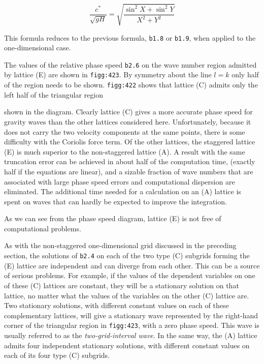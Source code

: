 \[\frac{c^*}{ \sqrt{gH}} = \sqrt{\frac{\sin^{2}X + \sin^{2}Y}{X^{2} + Y^{2}}}\]

This formula reduces to the previous formula, \texttt{b1.8} or
\texttt{b1.9}, when applied to the one-dimensional case.

The values of the relative phase speed \texttt{b2.6} on the wave number
region admitted by lattice (E) are shown in \texttt{figg:423}. By
symmetry about the line \(l = k\) only half of the region needs to be
shown. \texttt{figg:422} shows that lattice (C) admits only the left
half of the triangular region


shown in the diagram. Clearly lattice (C) gives a more accurate phase
speed for gravity waves than the other lattices considered here.
Unfortunately, because it does not carry the two velocity components at
the same points, there is some difficulty with the Coriolis force term.
Of the other lattices, the staggered lattice (E) is much superior to the
non-staggered lattice (A). A result with the same truncation error can
be achieved in about half of the computation time, (exactly half if the
equations are linear), and a sizable fraction of wave numbers that are
associated with large phase speed errors and computational dispersion
are eliminated. The additional time needed for a calculation on an (A)
lattice is spent on waves that can hardly be expected to improve the
integration.

As we can see from the phase speed diagram, lattice (E) is not free of
computational problems.

As with the non-staggered one-dimensional grid discussed in the
preceding section, the solutions of \texttt{b2.4} on each of the two
type (C) subgrids forming the (E) lattice are independent and can
diverge from each other. This can be a source of serious problems. For
example, if the values of the dependent variables on one of these (C)
lattices are constant, they will be a stationary solution on that
lattice, no matter what the values of the variables on the other (C)
lattice are. Two stationary solutions, with different constant values on
each of these complementary lattices, will give a stationary wave
represented by the right-hand corner of the triangular region in
\texttt{figg:423}, with a zero phase speed. This wave is usually
referred to as the \emph{two-grid-interval wave}. In the same way, the
(A) lattice admits four independent stationary solutions, with different
constant values on each of its four type (C) subgrids.


